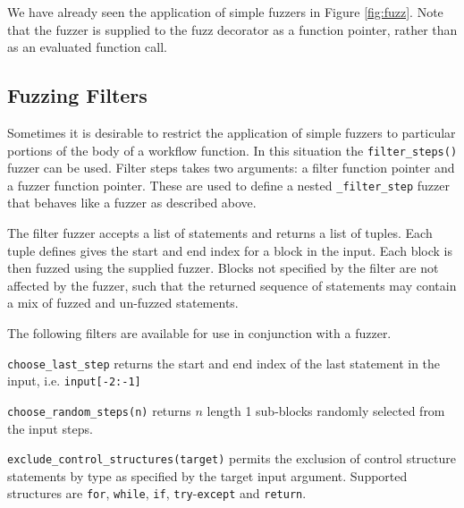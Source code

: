 \documentclass{sig-alternate}
\newenvironment{FunctionList}{%
\lstset{basicstyle=\ttfamily\bfseries\small}
\begin{list}{}{\leftmargin=5pt}
}{\end{list}\lstset{basicstyle=\ttfamily\small}}
\begin{document}
We have already seen the application of simple fuzzers in Figure \ref{fig:fuzz}.
Note that the fuzzer is supplied to the fuzz decorator as a function pointer,
rather than as an evaluated function call.


\subsection{Fuzzing Filters}


Sometimes it is desirable to restrict the application of simple fuzzers to
particular portions of the body of a workflow function.  In this situation the
\lstinline!filter_steps()! fuzzer can be used.  Filter steps takes two
arguments: a filter function pointer and a fuzzer function pointer.  These are
used to define a nested \lstinline!_filter_step! fuzzer that behaves like a
fuzzer as described above.

The filter fuzzer accepts a list of statements and returns a list of tuples.
Each tuple defines gives the start and end index for a block in the input.  Each
block is then fuzzed using the supplied fuzzer.  Blocks not specified by the
filter are not affected by the fuzzer, such that the returned sequence of
statements may contain a mix of fuzzed and un-fuzzed statements.

The following filters are available for use in conjunction with a fuzzer.


\begin{FunctionList}

\item \lstinline!choose_last_step! returns the start and end index of the last
  statement in the input, i.e. \lstinline!input[-2:-1]!

\item \lstinline!choose_random_steps(n)!  returns $n$ length 1 sub-blocks
  randomly selected from the input steps.

\item \lstinline!exclude_control_structures(target)! permits the exclusion of
  control structure statements by type as specified by the target input
  argument. Supported structures are \lstinline!for!, \lstinline!while!,
  \lstinline!if!, \lstinline!try!-\lstinline!except! and \lstinline!return!.

\end{FunctionList}
\end{document}
